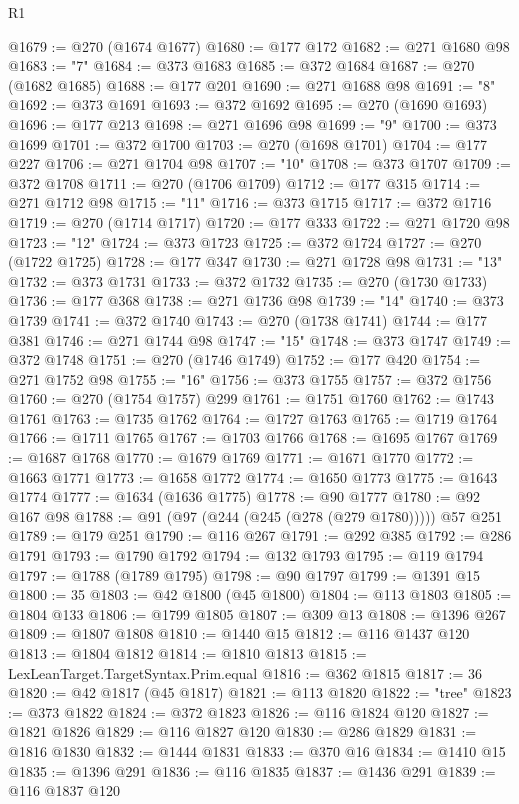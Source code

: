 \begin{lexlean}{R1}
\begin{coremodule}
@1679 := @270 (@1674 @1677)
@1680 := @177 @172
@1682 := @271 @1680 @98
@1683 := "7"
@1684 := @373 @1683
@1685 := @372 @1684
@1687 := @270 (@1682 @1685)
@1688 := @177 @201
@1690 := @271 @1688 @98
@1691 := "8"
@1692 := @373 @1691
@1693 := @372 @1692
@1695 := @270 (@1690 @1693)
@1696 := @177 @213
@1698 := @271 @1696 @98
@1699 := "9"
@1700 := @373 @1699
@1701 := @372 @1700
@1703 := @270 (@1698 @1701)
@1704 := @177 @227
@1706 := @271 @1704 @98
@1707 := "10"
@1708 := @373 @1707
@1709 := @372 @1708
@1711 := @270 (@1706 @1709)
@1712 := @177 @315
@1714 := @271 @1712 @98
@1715 := "11"
@1716 := @373 @1715
@1717 := @372 @1716
@1719 := @270 (@1714 @1717)
@1720 := @177 @333
@1722 := @271 @1720 @98
@1723 := "12"
@1724 := @373 @1723
@1725 := @372 @1724
@1727 := @270 (@1722 @1725)
@1728 := @177 @347
@1730 := @271 @1728 @98
@1731 := "13"
@1732 := @373 @1731
@1733 := @372 @1732
@1735 := @270 (@1730 @1733)
@1736 := @177 @368
@1738 := @271 @1736 @98
@1739 := "14"
@1740 := @373 @1739
@1741 := @372 @1740
@1743 := @270 (@1738 @1741)
@1744 := @177 @381
@1746 := @271 @1744 @98
@1747 := "15"
@1748 := @373 @1747
@1749 := @372 @1748
@1751 := @270 (@1746 @1749)
@1752 := @177 @420
@1754 := @271 @1752 @98
@1755 := "16"
@1756 := @373 @1755
@1757 := @372 @1756
@1760 := @270 (@1754 @1757) @299
@1761 := @1751 @1760
@1762 := @1743 @1761
@1763 := @1735 @1762
@1764 := @1727 @1763
@1765 := @1719 @1764
@1766 := @1711 @1765
@1767 := @1703 @1766
@1768 := @1695 @1767
@1769 := @1687 @1768
@1770 := @1679 @1769
@1771 := @1671 @1770
@1772 := @1663 @1771
@1773 := @1658 @1772
@1774 := @1650 @1773
@1775 := @1643 @1774
@1777 := @1634 (@1636 @1775)
@1778 := @90 @1777
@1780 := @92 @167 @98
@1788 := @91 (@97 (@244 (@245 (@278 (@279 @1780))))) @57 @251
@1789 := @179 @251
@1790 := @116 @267
@1791 := @292 @385
@1792 := @286 @1791
@1793 := @1790 @1792
@1794 := @132 @1793
@1795 := @119 @1794
@1797 := @1788 (@1789 @1795)
@1798 := @90 @1797
@1799 := @1391 @15
@1800 := 35
@1803 := @42 @1800 (@45 @1800)
@1804 := @113 @1803
@1805 := @1804 @133
@1806 := @1799 @1805
@1807 := @309 @13
@1808 := @1396 @267
@1809 := @1807 @1808
@1810 := @1440 @15
@1812 := @116 @1437 @120
@1813 := @1804 @1812
@1814 := @1810 @1813
@1815 := LexLeanTarget.TargetSyntax.Prim.equal
@1816 := @362 @1815
@1817 := 36
@1820 := @42 @1817 (@45 @1817)
@1821 := @113 @1820
@1822 := "tree"
@1823 := @373 @1822
@1824 := @372 @1823
@1826 := @116 @1824 @120
@1827 := @1821 @1826
@1829 := @116 @1827 @120
@1830 := @286 @1829
@1831 := @1816 @1830
@1832 := @1444 @1831
@1833 := @370 @16
@1834 := @1410 @15
@1835 := @1396 @291
@1836 := @116 @1835
@1837 := @1436 @291
@1839 := @116 @1837 @120

\end{coremodule}
\end{lexlean}
